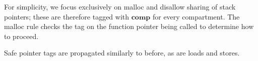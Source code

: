 \documentclass{article}
\begin{document}
For simplicity, we focus exclusively on malloc and disallow sharing of stack pointers;
these are therefore tagged with \(\mathbf{comp}\) for every compartment. The malloc rule
checks the tag on the function pointer being called to determine how to proceed.

\hspace{-5em}
\begin{minipage}{0.35\textwidth}
\end{minipage}
\begin{minipage}{0.35\textwidth}
\end{minipage}
\begin{minipage}{0.29\textwidth}
\end{minipage}

Safe pointer tags are propagated similarly to before, as are loads and stores.
\end{document}
